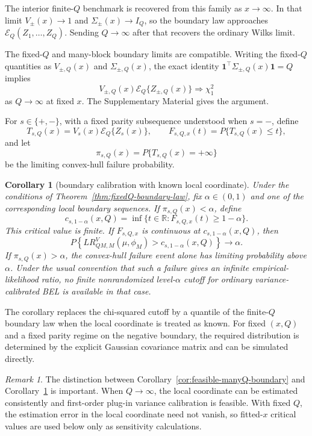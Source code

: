 \documentclass[12pt]{article}
\newtheorem{Corollary}[Theorem]{Corollary}
\theoremstyle{remark}
\newtheorem{Remark}[Theorem]{Remark}
\begin{document}
The interior finite-$Q$ benchmark is recovered from this family as $x\to\infty$. In that limit $V_\pm(x)\to1$ and $\Sigma_\pm(x)\to I_Q$, so the boundary law approaches $\mathcal E_Q(Z_1,\ldots,Z_Q)$. Sending $Q\to\infty$ after that recovers the ordinary Wilks limit.

The fixed-$Q$ and many-block boundary limits are compatible. Writing the fixed-$Q$ quantities as $V_{\pm,Q}(x)$ and $\Sigma_{\pm,Q}(x)$, the exact identity $\mathbf 1^\top\Sigma_{\pm,Q}(x)\mathbf 1=Q$ implies
\[
V_{\pm,Q}(x)\mathcal E_Q\{Z_{\pm,Q}(x)\}\Rightarrow\chi_1^2
\]
as $Q\to\infty$ at fixed $x$. The Supplementary Material gives the argument.

For $s\in\{+,-\}$, with a fixed parity subsequence understood when $s=-$, define
\[
T_{s,Q}(x)=V_s(x)\mathcal E_Q\{Z_s(x)\},
\qquad
F_{s,Q,x}(t)=P\{T_{s,Q}(x)\le t\},
\]
and let
\[
\pi_{s,Q}(x)=P\{T_{s,Q}(x)=+\infty\}
\]
be the limiting convex-hull failure probability.

\begin{Corollary}[boundary calibration with known local coordinate]
\label{cor:boundary-critical-values}
Under the conditions of Theorem~\ref{thm:fixedQ-boundary-law}, fix $\alpha\in(0,1)$ and one of the corresponding local boundary sequences. If $\pi_{s,Q}(x)<\alpha$, define
\[
c_{s,1-\alpha}(x,Q)
=
\inf\{t\in\mathbb R:F_{s,Q,x}(t)\ge1-\alpha\}.
\]
This critical value is finite. If $F_{s,Q,x}$ is continuous at $c_{s,1-\alpha}(x,Q)$, then
\[
P\!\left\{
LR^V_{QM,M}(\mu,\phi_M)>
c_{s,1-\alpha}(x,Q)
\right\}
\longrightarrow\alpha.
\]
If $\pi_{s,Q}(x)>\alpha$, the convex-hull failure event alone has limiting probability above $\alpha$. Under the usual convention that such a failure gives an infinite empirical-likelihood ratio, no finite nonrandomized level-$\alpha$ cutoff for ordinary variance-calibrated BEL is available in that case.
\end{Corollary}

The corollary replaces the chi-squared cutoff by a quantile of the finite-$Q$ boundary law when the local coordinate is treated as known. For fixed $(x,Q)$ and a fixed parity regime on the negative boundary, the required distribution is determined by the explicit Gaussian covariance matrix and can be simulated directly.

\begin{Remark}
\label{rem:known-x-boundary}
The distinction between Corollary~\ref{cor:feasible-manyQ-boundary} and Corollary~\ref{cor:boundary-critical-values} is important. When $Q\to\infty$, the local coordinate can be estimated consistently and first-order plug-in variance calibration is feasible. With fixed $Q$, the estimation error in the local coordinate need not vanish, so fitted-$x$ critical values are used below only as sensitivity calculations.
\end{Remark}
\end{document}
